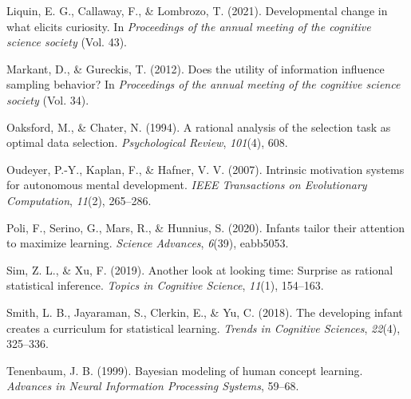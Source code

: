\documentclass[10pt, letterpaper]{article}
\newenvironment{CSLReferences}%
  {}%
  {\par}
\begin{document}
\begin{CSLReferences}{1}{0}
\leavevmode{}%
Liquin, E. G., Callaway, F., \& Lombrozo, T. (2021). Developmental
change in what elicits curiosity. In \emph{Proceedings of the annual
meeting of the cognitive science society} (Vol. 43).

\leavevmode{}%
Markant, D., \& Gureckis, T. (2012). Does the utility of information
influence sampling behavior? In \emph{Proceedings of the annual meeting
of the cognitive science society} (Vol. 34).

\leavevmode{}%
Oaksford, M., \& Chater, N. (1994). A rational analysis of the selection
task as optimal data selection. \emph{Psychological Review},
\emph{101}(4), 608.

\leavevmode{}%
Oudeyer, P.-Y., Kaplan, F., \& Hafner, V. V. (2007). Intrinsic
motivation systems for autonomous mental development. \emph{IEEE
Transactions on Evolutionary Computation}, \emph{11}(2), 265--286.

\leavevmode{}%
Poli, F., Serino, G., Mars, R., \& Hunnius, S. (2020). Infants tailor
their attention to maximize learning. \emph{Science Advances},
\emph{6}(39), eabb5053.

\leavevmode{}%
Sim, Z. L., \& Xu, F. (2019). Another look at looking time: Surprise as
rational statistical inference. \emph{Topics in Cognitive Science},
\emph{11}(1), 154--163.

\leavevmode{}%
Smith, L. B., Jayaraman, S., Clerkin, E., \& Yu, C. (2018). The
developing infant creates a curriculum for statistical learning.
\emph{Trends in Cognitive Sciences}, \emph{22}(4), 325--336.

\leavevmode{}%
Tenenbaum, J. B. (1999). Bayesian modeling of human concept learning.
\emph{Advances in Neural Information Processing Systems}, 59--68.

\end{CSLReferences}


\end{document}
